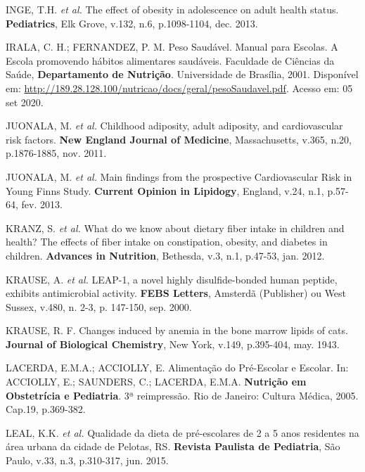 \bigbreak

\noindent INGE, T.H. \textit{et al.} The effect of obesity in adolescence on adult health status. \textbf{Pediatrics}, Elk Grove, v.132, n.6, p.1098-1104, dec. 2013. 

\bigbreak

\noindent IRALA, C. H.; FERNANDEZ, P. M. Peso Saudável. Manual para Escolas. A Escola promovendo hábitos alimentares saudáveis. Faculdade de Ciências da Saúde, \textbf{Departamento de Nutrição}. Universidade de Brasília, 2001. Disponível em: \url{http://189.28.128.100/nutricao/docs/geral/pesoSaudavel.pdf}. Acesso em: 05 set 2020. 

\bigbreak

\noindent JUONALA, M. \textit{et al.} Childhood adiposity, adult adiposity, and cardiovascular risk factors. \textbf{New England Journal of Medicine}, Massachusetts, v.365, n.20, p.1876-1885, nov. 2011.

\bigbreak

\noindent JUONALA, M. \textit{et al.} Main findings from the prospective Cardiovascular Risk in Young Finns Study. \textbf{Current Opinion in Lipidogy}, England, v.24, n.1, p.57-64, fev. 2013.

\bigbreak

\noindent KRANZ, S. \textit{et al.} What do we know about dietary fiber intake in children and health? The effects of fiber intake on constipation, obesity, and diabetes in children. \textbf{Advances in Nutrition}, Bethesda, v.3, n.1, p.47-53, jan. 2012.

\bigbreak

\noindent KRAUSE, A. \textit{et al.} LEAP-1, a novel highly disulfide-bonded human peptide, exhibits antimicrobial activity. \textbf{FEBS Letters}, Amsterdã (Publisher) ou West Sussex, v.480, n. 2-3, p. 147-150, sep. 2000.
\bigbreak

\noindent KRAUSE, R. F. Changes induced by anemia in the bone marrow lipids of cats. \textbf{Journal of Biological Chemistry}, New York, v.149, p.395-404, may. 1943.

\bigbreak

\noindent LACERDA, E.M.A.; ACCIOLLY, E. Alimentação do Pré-Escolar e Escolar. In: ACCIOLLY, E.; SAUNDERS, C.; LACERDA, E.M.A. \textbf{Nutrição em Obstetrícia e Pediatria}. 3ª reimpressão. Rio de Janeiro: Cultura Médica, 2005. Cap.19, p.369-382. 

\bigbreak

\noindent LEAL, K.K. \textit{et al.} Qualidade da dieta de pré-escolares de 2 a 5 anos residentes na área urbana da cidade de Pelotas, RS. \textbf{Revista Paulista de Pediatria}, São Paulo, v.33, n.3, p.310-317, jun. 2015.

